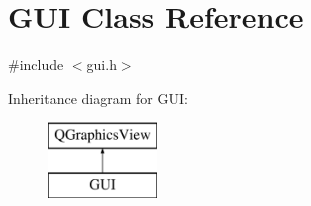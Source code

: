 \hypertarget{class_g_u_i}{}\section{G\+UI Class Reference}
\label{class_g_u_i}


{\ttfamily \#include $<$gui.\+h$>$}

Inheritance diagram for G\+UI\+:\begin{figure}[H]
\begin{center}
\leavevmode
\includegraphics[height=2.000000cm]{class_g_u_i}
\end{center}
\end{figure}
